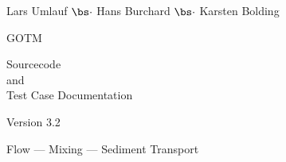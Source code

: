 \documentclass[a4paper,twoside]{article}
\begin{document}
\begin{titlepage}


{\sf \bf \LARGE
 \begin{center}
   Lars Umlauf $\bs \cdot$ Hans Burchard $\bs \cdot$ Karsten Bolding
 \end{center}
}

\vspace{14mm}

{\sf \bf \Huge
 \begin{center}
   GOTM
 \end{center}
}

\vspace{6mm}

{\sf \bf \LARGE
 \begin{center}
   Sourcecode \\
      and \\
Test Case Documentation
 \end{center}
}


\vspace{5mm}

{\sf \bf \Large
 \begin{center}
  Version 3.2
 \end{center}
}

\vspace{8mm}

\begin{figure}[!h]
  \begin{center}
  \end{center}
\end{figure}

\vspace{7mm}

{\sf \bf \Large
 \begin{center}
  Flow ---  Mixing --- Sediment Transport
\end{center}
}


\end{titlepage}


\tableofcontents


























%

%





\end{document}
